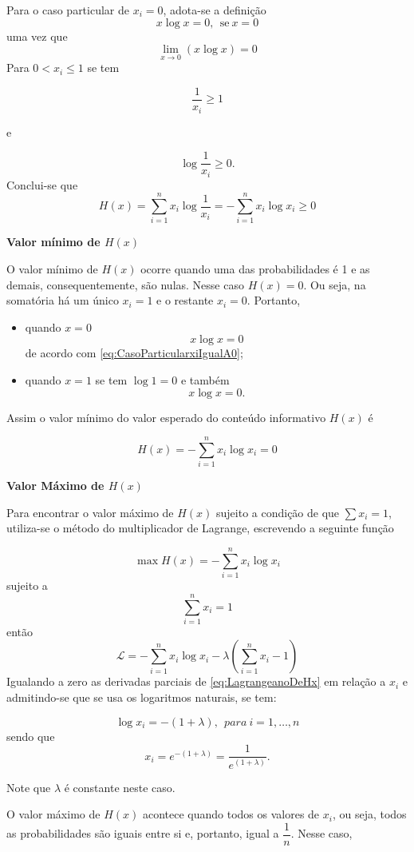 \documentclass[
]{book}
\begin{document}
Para o caso particular de \(x_i= 0\), adota-se a definição
\[
 x\log x = 0,~~\text{se}~x = 0
 \label{eq:CasoParticularxiIgualA0}
\]
uma vez que
\[
  \lim_{x\rightarrow 0}(x\log x) = 0
\]
Para \(0 < x_i \leq 1\) se tem

\[
\dfrac{1}{x_i}\geq 1
\]

e

\[
\log \dfrac{1}{x_i} \geq 0.
\]
Conclui-se que
\[
H(x) = \sum_{i=1}^{n} x_i \log \dfrac{1}{x_i} = - \sum_{i=1}^{n} x_i \log x_i \geq 0 
\]

\textbf{Valor mínimo de \(H(x)\)}

O valor mínimo de \(H(x)\) ocorre quando uma das probabilidades é 1 e as demais, consequentemente, são nulas. Nesse caso \(H(x) = 0\). Ou seja, na somatória há um único \(x_i=1\) e o restante \(x_i = 0\). Portanto,

\begin{itemize}
\item
  quando \(x=0\)
  \[
    x \log x = 0
  \]
  de acordo com \eqref{eq:CasoParticularxiIgualA0};
\item
  quando \(x=1\) se tem \(\log 1 = 0\) e também
  \[
    x \log x = 0.
  \]
\end{itemize}

Assim o valor mínimo do valor esperado do conteúdo informativo \(H(x)\) é

\[
H(x) = - \sum_{i=1}^{n}x_i \log x_i = 0
\]

\textbf{Valor Máximo de \(H(x)\)}

Para encontrar o valor máximo de \(H(x)\) sujeito a condição de que \(\sum x_i = 1\), utiliza-se o método do multiplicador de Lagrange, escrevendo a seguinte função

\[
  \max H(x) = -\sum_{i=1}^{n}x_i \log x_i
\]
sujeito a
\[
  \sum_{i=1}^{n} x_i = 1
\]
então
\[
  \mathcal{L} = -\sum_{i=1}^{n}x_i \log x_i - \lambda\left( \sum_{i=1}^{n} x_i  - 1 \right)
  \label{eq:LagrangeanoDeHx}
\]
Igualando a zero as derivadas parciais de \eqref{eq:LagrangeanoDeHx} em relação a \(x_i\) e admitindo-se que se usa os logaritmos naturais, se tem:

\[
  \log x_i = -(1 + \lambda),~~para~i=1,\ldots ,n
\]
sendo que
\[
  x_i = e^{-(1+\lambda)} = \dfrac{1}{e^{(1+\lambda)}}.
\]

Note que \(\lambda\) é constante neste caso.

O valor máximo de \(H(x)\) acontece quando todos os valores de \(x_i\), ou seja, todos as probabilidades são iguais entre si e, portanto, igual a \(\dfrac{1}{n}\). Nesse caso,
\end{document}

